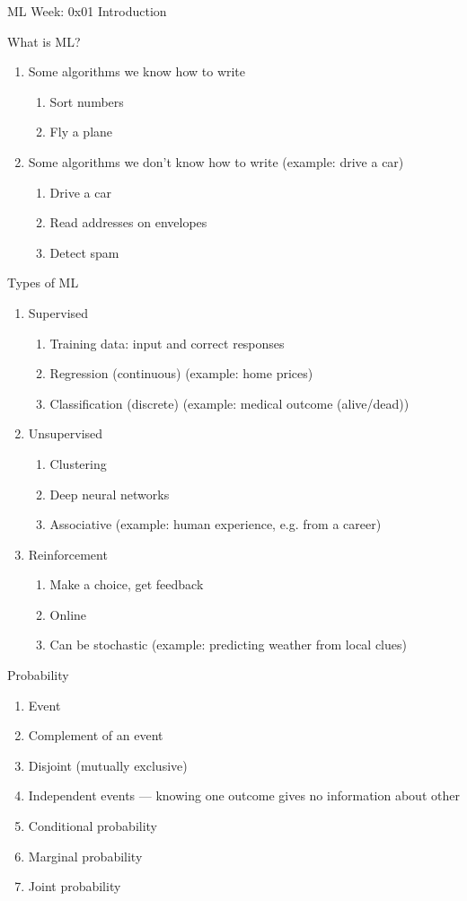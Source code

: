 



\centerline{\large ML Week: 0x01 \hspace{2mm}  Introduction}
\vspace{10mm}

What is ML?
\begin{enumerate}
\item Some algorithms we know how to write
  \begin{enumerate}
  \item Sort numbers
  \item Fly a plane
  \end{enumerate}
\item Some algorithms we don't know how to write (example: drive a car)
  \begin{enumerate}
  \item Drive a car 
  \item Read addresses on envelopes
  \item Detect spam
  \end{enumerate}
\end{enumerate}

Types of ML
\begin{enumerate}
\item Supervised
  \begin{enumerate}
  \item Training data: input and correct responses
  \item Regression (continuous) (example: home prices)
  \item Classification (discrete) (example: medical outcome (alive/dead))
  \end{enumerate}
\item Unsupervised
  \begin{enumerate}
  \item Clustering
  \item Deep neural networks
  \item Associative (example: human experience, e.g. from a career)
  \end{enumerate}
\item Reinforcement
  \begin{enumerate}
  \item Make a choice, get feedback
  \item Online
  \item Can be stochastic (example: predicting weather from local clues)
  \end{enumerate}
\end{enumerate}

Probability
\begin{enumerate}
\item Event
\item Complement of an event
\item Disjoint (mutually exclusive)
\item Independent events --- knowing one outcome gives no information about other
\item Conditional probability
\item Marginal probability
\item Joint probability
\end{enumerate}



